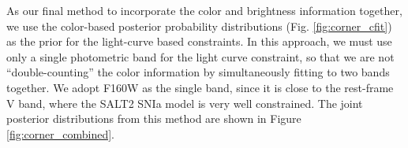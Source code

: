 \documentclass[12pt]{article}
\def\SNABC{AT 2016tbd\xspace}
\begin{document}

As our final method to incorporate the color and brightness information together, we use the color-based posterior probability distributions (Fig. \ref{fig:corner_cfit}) as the prior for 
the light-curve based constraints. In this approach, we must use only a single photometric band for the light curve constraint, so that we are not ``double-counting'' the color information by simultaneously fitting to two bands together.  We adopt F160W as the single band, since it is close to the rest-frame V band, where the SALT2 SNIa model is very well constrained.  The joint posterior distributions from this method are shown in Figure \ref{fig:corner_combined}.  


\end{document}
